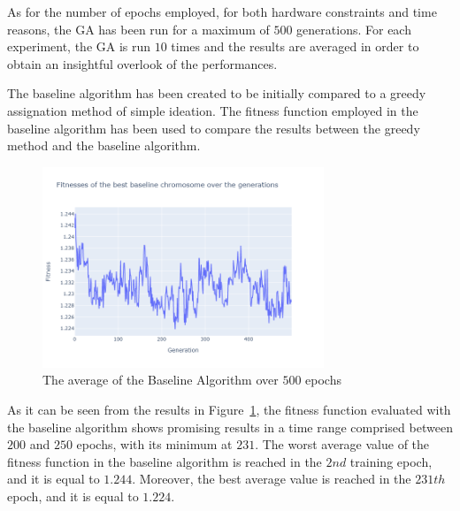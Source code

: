 As for the number of epochs employed, for both hardware constraints and time reasons, the GA has been run for a maximum of $500$ generations.
For each experiment, the GA is run $10$ times and the results are averaged in order to obtain an insightful overlook of the performances.

The baseline algorithm has been created to be initially compared to a greedy assignation method of simple ideation.
The fitness function employed in the baseline algorithm has been used to compare the results between the greedy method and the baseline algorithm.


\begin{figure}[ht]
    \centering
    \includegraphics[width=0.75\textwidth]{../../../Code/Genetic/results/baseline/graphs/pop_size_200/500_epochs/average_fitness.png}
    \caption{The average of the Baseline Algorithm over $500$ epochs}
    \label{fig:average_baseline}
\end{figure}


As it can be seen from the results in Figure~\ref{fig:average_baseline}, the fitness function evaluated with the baseline algorithm shows promising results
in a time range comprised between $200$ and $250$ epochs, with its minimum at $231$.
The worst average value of the fitness function in the baseline algorithm is reached in the $2nd$ training epoch, and it is equal to $1.244$.
Moreover, the best average value is reached in the $231th$ epoch, and it is equal to $1.224$.


